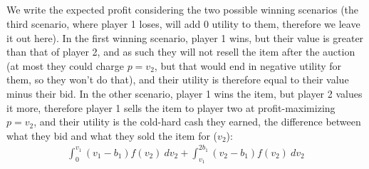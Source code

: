 \documentclass[a4paper,12pt]{article}
\begin{document}
\subsection{}
% 
We write the expected profit considering the two possible winning scenarios (the third scenario, where player 1 loses, will add 0 utility to them, therefore we leave it out here). In the first winning scenario, player 1 wins, but their value is greater than that of player 2, and as such they will not resell the item after the auction (at most they could charge $p = v_2$, but that would end in negative utility for them, so they won't do that), and their utility is therefore equal to their value minus their bid. In the other scenario, player 1 wins the item, but player 2 values it more, therefore player 1 sells the item to player two at profit-maximizing $p = v_2$, and their utility is the cold-hard cash they earned, the difference between what they bid and what they sold the item for ($v_2$):
\begin{align} \label{eq:utility}
\int_0^{v_1}(v_1 - b_1)f(v_2) \ dv_2 + \int_{v_1}^{2b_1}(v_2 - b_1)f(v_2) \ dv_2
\end{align}
\end{document}
